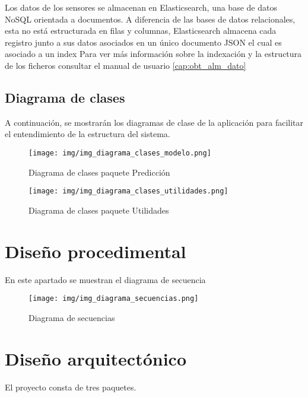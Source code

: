 Los datos de los sensores se almacenan en Elasticsearch, una base de datos NoSQL orientada a documentos. A diferencia de las bases de datos relacionales, esta no está estructurada en filas y columnas, Elasticsearch almacena cada registro junto a sus datos asociados en un único documento JSON el cual es asociado a un index Para ver más información sobre la indexación y la estructura de los ficheros consultar el manual de usuario \ref{cap:obt_alm_dato}

\subsection{Diagrama de clases}
 A continuación, se mostrarán los diagramas de clase de la aplicación para facilitar el entendimiento de la estructura del sistema.
 
\begin{figure}[h]
	\centering
	\texttt{[image: img/img\_diagrama\_clases\_modelo.png]}
	\caption{Diagrama de clases paquete Predicción}
	\label{img_diagrama_clases_modelo}
\end{figure}

\begin{figure}[h]
	\centering
	\texttt{[image: img/img\_diagrama\_clases\_utilidades.png]}
	\caption{Diagrama de clases paquete Utilidades}
	\label{img_diagrama_clases_modelo}
\end{figure}

\newpage

\section{Diseño procedimental}

En este apartado se muestran el diagrama de secuencia

\begin{figure}[h]
	\centering
	\texttt{[image: img/img\_diagrama\_secuencias.png]}
	\caption{Diagrama de secuencias}
	\label{img_diagrama_secuencias}
\end{figure}
\newpage

\section{Diseño arquitectónico}

El proyecto consta de tres paquetes.

